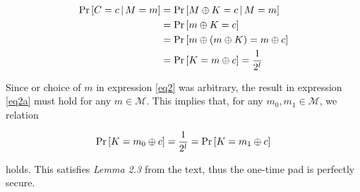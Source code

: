 \documentclass{article}[12]
\numberwithin{equation}{section}
\begin{document}
\begin{flushleft}
\begin{align}
\Pr \left[ C = c \, \vert \, M = m \right] &= \Pr \left[ M \oplus K = c \, \vert \, M = m \right] \notag \\
&= \Pr \left[ m \oplus K = c \right] \notag \\
&= \Pr \left[ m \oplus \left( m \oplus K \right) = m \oplus c \right] \notag \\
&= \Pr \left[ K = m \oplus c \right] = \frac{1}{2^l} \label{eq2a}
\end{align}

Since or choice of $m$ in expression \ref{eq2} was arbitrary, the result in expression \ref{eq2a} must hold for any $m \in \mathcal{M}$.  This implies that, for any $m_0, m_1 \in \mathcal{M}$, we relation

\begin{align}
\Pr \left[ K = m_0 \oplus c \right] = \frac{1}{2^l} = \Pr \left[ K = m_1 \oplus c \right] \notag
\end{align}

holds.  This satisfies \emph{Lemma 2.3} from the text, thus the one-time pad is perfectly secure.











































































\end{flushleft}
\end{document}
